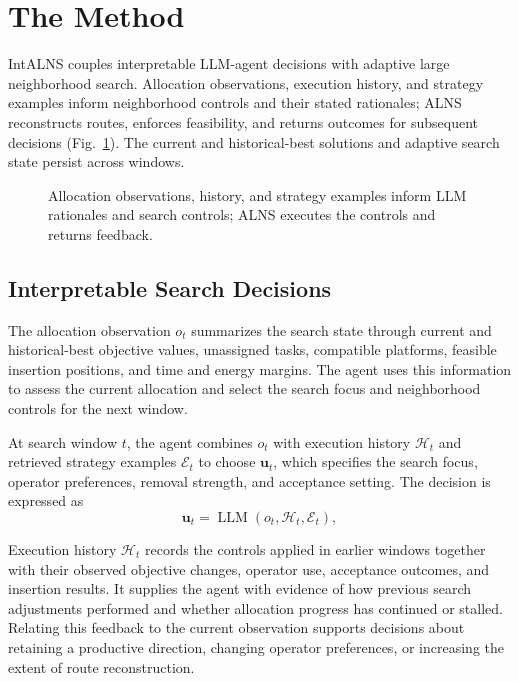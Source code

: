 \section{The \IntALNS{} Method}
\label{sec:method}
IntALNS couples interpretable LLM-agent decisions with adaptive large neighborhood search. Allocation observations, execution history, and strategy examples inform neighborhood controls and their stated rationales; ALNS reconstructs routes, enforces feasibility, and returns outcomes for subsequent decisions (Fig.~\ref{fig:framework}). The current and historical-best solutions and adaptive search state persist across windows.

\begin{figure}[htbp]
\centering

\caption{Allocation observations, history, and strategy examples inform LLM rationales and search controls; ALNS executes the controls and returns feedback.}
\label{fig:framework}
\end{figure}

\subsection{Interpretable Search Decisions}
\begin{samepage}
The allocation observation $o_t$ summarizes the search state through current and historical-best objective values, unassigned tasks, compatible platforms, feasible insertion positions, and time and energy margins. The agent uses this information to assess the current allocation and select the search focus and neighborhood controls for the next window.
\par\end{samepage}

\begin{samepage}
At search window $t$, the agent combines $o_t$ with execution history $\mathcal H_t$ and retrieved strategy examples $\mathcal E_t$ to choose $\mathbf u_t$, which specifies the search focus, operator preferences, removal strength, and acceptance setting. The decision is expressed as
\begin{equation}
 \mathbf u_t=\operatorname{LLM}(o_t,\mathcal H_t,\mathcal E_t),
 \label{eq:agent}
\end{equation}
\end{samepage}

Execution history $\mathcal H_t$ records the controls applied in earlier windows together with their observed objective changes, operator use, acceptance outcomes, and insertion results. It supplies the agent with evidence of how previous search adjustments performed and whether allocation progress has continued or stalled. Relating this feedback to the current observation supports decisions about retaining a productive direction, changing operator preferences, or increasing the extent of route reconstruction.

